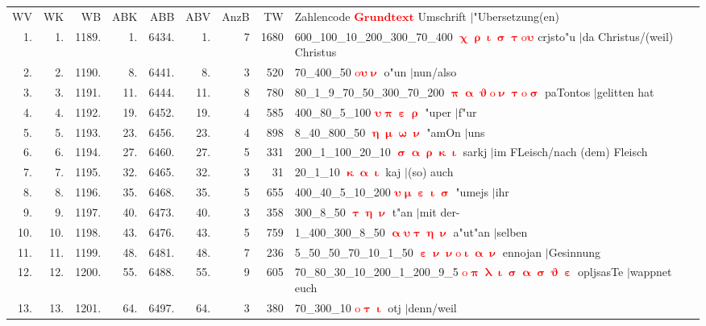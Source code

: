 \documentclass[a4paper,10pt,landscape]{article}
\begin{document}
\begin{tabular}{rrrrrrrrp{120mm}}
WV&WK&WB&ABK&ABB&ABV&AnzB&TW&Zahlencode \textcolor{red}{$\boldsymbol{Grundtext}$} Umschrift $|$"Ubersetzung(en)\\
1.&1.&1189.&1.&6434.&1.&7&1680&600\_100\_10\_200\_300\_70\_400 \textcolor{red}{$\boldsymbol{\upchi\uprho\upiota\upsigma\uptau\mathrm{o}\upsilon}$} crjsto"u $|$da Christus/(weil) Christus\\
2.&2.&1190.&8.&6441.&8.&3&520&70\_400\_50 \textcolor{red}{$\boldsymbol{\mathrm{o}\upsilon\upnu}$} o"un $|$nun/also\\
3.&3.&1191.&11.&6444.&11.&8&780&80\_1\_9\_70\_50\_300\_70\_200 \textcolor{red}{$\boldsymbol{\uppi\upalpha\upvartheta\mathrm{o}\upnu\uptau\mathrm{o}\upsigma}$} paTontos $|$gelitten hat\\
4.&4.&1192.&19.&6452.&19.&4&585&400\_80\_5\_100 \textcolor{red}{$\boldsymbol{\upsilon\uppi\upepsilon\uprho}$} "uper $|$f"ur\\
5.&5.&1193.&23.&6456.&23.&4&898&8\_40\_800\_50 \textcolor{red}{$\boldsymbol{\upeta\upmu\upomega\upnu}$} "amOn $|$uns\\
6.&6.&1194.&27.&6460.&27.&5&331&200\_1\_100\_20\_10 \textcolor{red}{$\boldsymbol{\upsigma\upalpha\uprho\upkappa\upiota}$} sarkj $|$im FLeisch/nach (dem) Fleisch\\
7.&7.&1195.&32.&6465.&32.&3&31&20\_1\_10 \textcolor{red}{$\boldsymbol{\upkappa\upalpha\upiota}$} kaj $|$(so) auch\\
8.&8.&1196.&35.&6468.&35.&5&655&400\_40\_5\_10\_200 \textcolor{red}{$\boldsymbol{\upsilon\upmu\upepsilon\upiota\upsigma}$} "umejs $|$ihr\\
9.&9.&1197.&40.&6473.&40.&3&358&300\_8\_50 \textcolor{red}{$\boldsymbol{\uptau\upeta\upnu}$} t"an $|$mit der-\\
10.&10.&1198.&43.&6476.&43.&5&759&1\_400\_300\_8\_50 \textcolor{red}{$\boldsymbol{\upalpha\upsilon\uptau\upeta\upnu}$} a"ut"an $|$selben\\
11.&11.&1199.&48.&6481.&48.&7&236&5\_50\_50\_70\_10\_1\_50 \textcolor{red}{$\boldsymbol{\upepsilon\upnu\upnu\mathrm{o}\upiota\upalpha\upnu}$} ennojan $|$Gesinnung\\
12.&12.&1200.&55.&6488.&55.&9&605&70\_80\_30\_10\_200\_1\_200\_9\_5 \textcolor{red}{$\boldsymbol{\mathrm{o}\uppi\uplambda\upiota\upsigma\upalpha\upsigma\upvartheta\upepsilon}$} opljsasTe $|$wappnet euch\\
13.&13.&1201.&64.&6497.&64.&3&380&70\_300\_10 \textcolor{red}{$\boldsymbol{\mathrm{o}\uptau\upiota}$} otj $|$denn/weil\\

\end{tabular}
\end{document}
